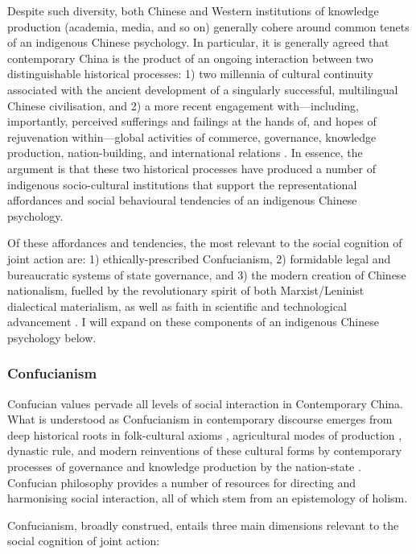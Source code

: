 \begin{CJK}{UTF8}{gbsn}
Despite such diversity, both Chinese and Western institutions of knowledge production (academia, media, and so on) generally cohere around common tenets of an indigenous Chinese psychology.  In particular, it is generally agreed that contemporary China is the product of an ongoing interaction between two distinguishable historical processes: 1) two millennia of cultural continuity associated with the ancient development of a singularly successful, multilingual Chinese civilisation, and 2) a more recent engagement with---including, importantly, perceived sufferings and failings at the hands of, and hopes of rejuvenation within---global activities of commerce, governance, knowledge production, nation-building, and international relations \citep{Liu2009}.  In essence, the argument is that these two historical processes have produced a number of indigenous socio-cultural institutions that support the representational affordances and social behavioural tendencies of an indigenous Chinese psychology.

Of these affordances and tendencies, the most relevant to the social cognition of joint action are: 1) ethically-prescribed Confucianism, 2) formidable legal and bureaucratic systems of state governance, and 3) the modern creation of Chinese nationalism, fuelled by the revolutionary spirit of both Marxist/Leninist dialectical materialism, as well as faith in scientific and technological advancement \citep{Barme2009}.  I will expand on these components of an indigenous Chinese psychology below.

\subsubsection{Confucianism}
Confucian values pervade all levels of social interaction in Contemporary China. What is understood as Confucianism in contemporary discourse emerges from deep historical roots in folk-cultural axioms \citep{Wang2009}, agricultural modes of production \citep{Talhelm2014,Fei1992}, dynastic rule, and modern reinventions of these cultural forms by contemporary processes of governance and knowledge production by the nation-state \citep{Hwang1999,Liu2014}.  Confucian philosophy provides a number of resources for directing and harmonising social interaction, all of which stem from an epistemology of holism.

Confucianism, broadly construed, entails three main dimensions relevant to the social cognition of joint action:


\end{CJK}
